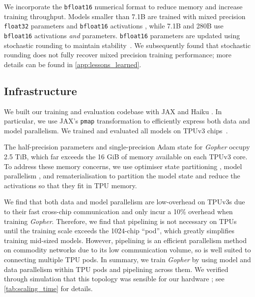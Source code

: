 \documentclass[11pt, a4paper, logo, internal, copyright, nonumbering]{deepmind}
\newcommand{\gopher}{\textit{Gopher}\xspace}
\begin{document}
We incorporate the \texttt{bfloat16} numerical format to reduce memory and increase training throughput. Models smaller than 7.1B are trained with mixed precision \texttt{float32} parameters and \texttt{bfloat16} activations \citep{micikevicius2017mixed}, while 7.1B and 280B use \texttt{bfloat16} activations \textit{and} parameters. \texttt{bfloat16} parameters are updated using stochastic rounding to maintain stability~\citep{gupta2015deep}.
We subsequently found that stochastic rounding does not fully recover mixed precision training performance; more details can be found in \autoref{app:lessons_learned}.

\subsection{Infrastructure}
\label{method:infra}
We built our training and evaluation codebase with JAX \citep{jax2018github} and Haiku \citep{haiku2020github}.
In particular, we use JAX's \texttt{pmap} transformation to efficiently express both data and model parallelism.
We trained and evaluated all models on TPUv3 chips~\citep{tpuacm}.


The half-precision parameters and single-precision Adam state for \gopher occupy 2.5 TiB, which far exceeds the 16 GiB of memory available on each TPUv3 core. To address these memory concerns, we use optimiser state partitioning \citep{rajbhandari2020zero}, model parallelism \citep{shoeybi2019megatron}, and rematerialisation \citep{griewank2000algorithm} to partition the model state and reduce the activations so that they fit in TPU memory.

We find that both data and model parallelism are low-overhead on TPUv3s due to their fast cross-chip communication and only incur a 10\% overhead when training \gopher. Therefore, we find that pipelining \citep{huang2019gpipe} is not necessary on TPUs until the training scale exceeds the 1024-chip ``pod'', which greatly simplifies training mid-sized models.
However, pipelining is an efficient parallelism method on commodity networks due to its low communication volume, so is well suited to connecting multiple TPU pods.
In summary, we train \gopher by using model and data parallelism within TPU pods and pipelining across them. We verified through simulation that this topology was sensible for our hardware \citep{automap2021}; see \autoref{tab:scaling_time} for details.
\end{document}
